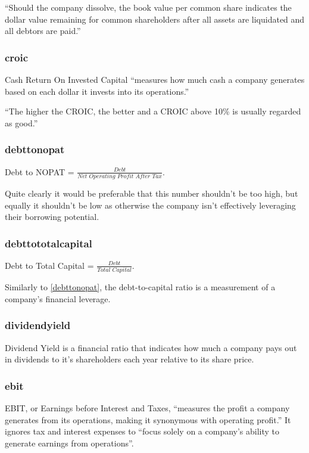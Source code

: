``Should the company dissolve, the book value per common share indicates the dollar value remaining for common shareholders after all assets are liquidated and all debtors are paid.'' \cite{bookValuePerShare}

\subsubsection*{croic}
Cash Return On Invested Capital ``measures how much cash a company generates based on each dollar it invests into its operations.'' \newline

``The higher the CROIC, the better and a CROIC above 10\% is usually regarded as good.''\cite{croic}

\subsubsection*{debttonopat} \label{debttonopat}
Debt to NOPAT = $\frac{Debt}{Net \, \, Operating \, \, Profit \, \, After \, \, Tax}$. \newline

Quite clearly it would be preferable that this number shouldn't be too high, but equally it shouldn't be low as otherwise the company isn't effectively leveraging their borrowing potential.\cite{intrinioDataTags}

\subsubsection*{debttototalcapital}
Debt to Total Capital = $\frac{Debt}{Total \, \, Capital}$. \newline

Similarly to \ref{debttonopat}, the debt-to-capital ratio is a measurement of a company's financial leverage.\cite{intrinioDataTags}

\subsubsection*{dividendyield}
Dividend Yield is a financial ratio that indicates how much a company pays out in dividends to it's shareholders each year relative to its share price.\cite{intrinioDataTags}

\subsubsection*{ebit}
EBIT, or Earnings before Interest and Taxes, ``measures the profit a company generates from its operations, making it synonymous with operating profit.'' It ignores tax and interest expenses to ``focus solely on a company's ability to generate earnings from operations''.\cite{intrinioDataTags}

